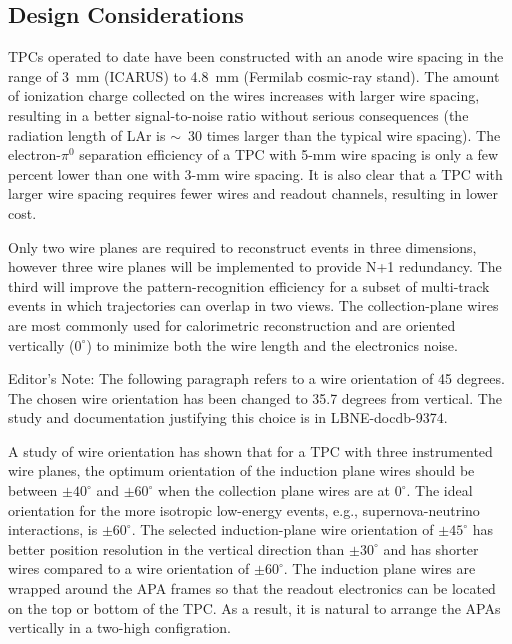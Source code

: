 \subsection{Design Considerations}

TPCs operated to date have been constructed with an anode wire spacing in the range of 3~mm (ICARUS) to 4.8~mm (Fermilab cosmic-ray stand). The amount of ionization charge collected on the wires increases with larger wire spacing, resulting in a better signal-to-noise ratio without serious consequences (the radiation length of LAr is $\sim$~30 times larger than the typical wire spacing). The electron-$\pi^0$ separation efficiency of a TPC with 5-mm wire spacing is only a few percent lower than one with 3-mm wire spacing. It is also clear that a TPC with larger wire spacing requires fewer wires and readout channels, resulting in lower cost. %

Only two wire planes are required to reconstruct events in three dimensions, however three wire planes will be implemented to provide N+1 redundancy. The third will improve the pattern-recognition efficiency for a subset of multi-track events in which trajectories can overlap in two views. The collection-plane wires are most commonly used for calorimetric reconstruction and are oriented vertically ($0^\circ$) to minimize both the wire length and the electronics noise.

\begin{editornote}
  Editor's Note:  The following paragraph refers to a wire orientation of 45 degrees.  The chosen wire orientation has been changed to 35.7 degrees from vertical.  The study and documentation justifying this choice is in LBNE-docdb-9374.
\end{editornote}


A study of wire orientation has shown that for a TPC with three instrumented wire planes, the optimum orientation of the induction plane wires should be between $\pm40^\circ$ and $\pm60^\circ$ when the collection plane wires are at $0^\circ$. The ideal orientation for the more isotropic low-energy events, e.g., 
supernova-neutrino interactions, is $\pm60^\circ$. The selected induction-plane wire orientation of $\pm45^\circ$ has better position resolution in the vertical direction than $\pm30^\circ$ and has shorter wires compared to a wire orientation of $\pm60^\circ$.  The induction plane wires are wrapped around the APA frames so that the readout electronics can be located on the top or bottom of the TPC. As a result, it is natural to arrange the APAs vertically in a two-high configration. 

